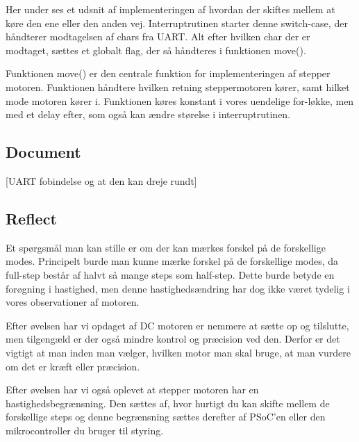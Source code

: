 \documentclass[../main.tex]{subfiles}
\begin{document}
Her under ses et udsnit af implementeringen af hvordan der skiftes mellem at køre den ene eller den anden vej. Interruptrutinen starter denne switch-case, der håndterer modtagelsen af chars fra UART. Alt efter hvilken char der er modtaget, sættes et globalt flag, der så håndteres i funktionen move().



Funktionen move() er den centrale funktion for implementeringen af stepper motoren. Funktionen håndtere hvilken retning steppermotoren kører, samt hilket mode motoren kører i. Funktionen køres konstant i vores uendelige for-løkke, men med et delay efter, som også kan ændre størelse i interruptrutinen.



\subsection{Document}

[UART fobindelse og at den kan dreje rundt]

\subsection{Reflect}
Et spørgsmål man kan stille er om der kan mærkes forskel på de forskellige modes.
Principelt burde man kunne mærke forskel på de forskellige modes, da full-step består af halvt så mange steps som half-step. 
Dette burde betyde en forøgning i hastighed, men denne hastighedsændring har dog ikke været tydelig i vores observationer af motoren.

Efter øvelsen har vi opdaget af DC motoren er nemmere at sætte op og tilslutte, men tilgengæld er der også mindre kontrol og præcision ved den.
Derfor er det vigtigt at man inden man vælger, hvilken motor man skal bruge, at man vurdere om det er kræft eller præcision.

Efter øvelsen har vi også oplevet at stepper motoren har en hastighedsbegrænsning.
Den sættes af, hvor hurtigt du kan skifte mellem de forskellige steps og denne begrænsning sættes derefter af PSoC'en eller den mikrocontroller du bruger til styring.
\end{document}

